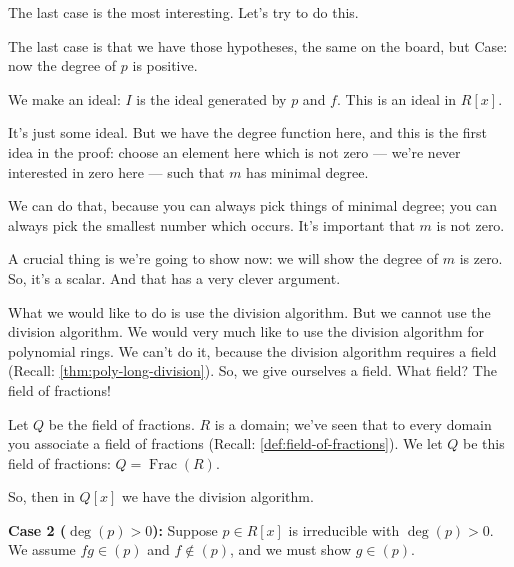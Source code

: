 \begin{proofWrapper}
\begin{speech}[00:36:57 - 00:39:16]
The last case is the most interesting. Let's try to do this.

The last case is that we have those hypotheses, the same on the board, but Case:  now the degree of $p$ is positive. 

We make an ideal: $I$ is the ideal generated by $p$ and $f$.  This is an ideal in $R[x]$.

It's just some ideal. But we have the degree function here, and this is the first idea in the proof: choose an element here which is not zero --- we're never interested in zero here --- such that $m$ has minimal degree. 

We can do that, because you can always pick things of minimal degree; you can always pick the smallest number which occurs. It's important that $m$ is not zero.

A crucial thing is we're going to show now: we will show the degree of $m$ is zero.  So, it's a scalar. And that has a very clever argument.

What we would like to do is use the division algorithm. But we cannot use the division algorithm. We would very much like to use the division algorithm for polynomial rings.  We can't do it, because the division algorithm requires a field (Recall: \cref{thm:poly-long-division}). So, we give ourselves a field. What field? The field of fractions!

Let $Q$ be the field of fractions.  $R$ is a domain; we've seen that to every domain you associate a field of fractions (Recall: \cref{def:field-of-fractions}). We let $Q$ be this field of fractions: $Q = \operatorname{Frac}(R)$.

So, then in $Q[x]$ we have the division algorithm. 
\end{speech}

\begin{content}
\textbf{Case 2 ($\deg(p) > 0$):}
Suppose $p \in R[x]$ is irreducible with $\deg(p) > 0$. We assume $fg \in (p)$ and $f \notin (p)$, and we must show $g \in (p)$.


\end{content}
\end{proofWrapper}
